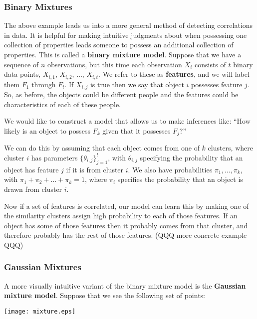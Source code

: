 \documentclass[11pt]{article}
\begin{document}
\subsubsection{Binary Mixtures}

The above example leads us into a more general method of detecting correlations in data. It is helpful for making intuitive judgments about when possessing one collection of properties leads someone to possess an additional collection of properties. This is called a \textbf{binary mixture model}. Suppose that we have a sequence of $n$ observations, but this time each observation $X_i$ consists of $t$ binary data points, $X_{i,1}$, $X_{i,2}$, $\ldots$, $X_{i,t}$. We refer to these as \textbf{features}, and we will label them $F_1$ through $F_t$. If $X_{i,j}$ is true then we say that object $i$ possesses feature $j$. So, as before, the objects could be different people and the features could be characteristics of each of these people.

We would like to construct a model that allows us to make inferences like: ``How likely is an object to possess $F_k$ given that it possesses $F_j$?''

We can do this by assuming that each object comes from one of $k$ clusters, where cluster $i$ has parameters $\{\theta_{i,j}\}_{j=1}^t$, with $\theta_{i,j}$ specifying the probability that an object has feature $j$ if it is from cluster $i$. We also have probabilities $\pi_1,\ldots,\pi_k$, with $\pi_1+\pi_2+\ldots+\pi_k=1$, where $\pi_i$ specifies the probability that an object is drawn from cluster $i$.

Now if a set of features is correlated, our model can learn this by making one of the similarity clusters assign high probability to each of those features. If an object has some of those features then it probably comes from that cluster, and therefore probably has the rest of those features. (QQQ more concrete example QQQ)

\subsubsection{Gaussian Mixtures}

A more visually intuitive variant of the binary mixture model is the \textbf{Gaussian mixture model}. Suppose that we see the following set of points:

\begin{center}
\texttt{[image: mixture.eps]}
\end{center}
\end{document}
